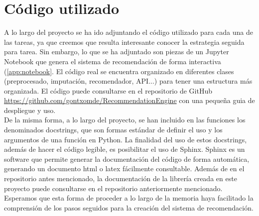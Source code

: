 \section{Código utilizado}

A lo largo del proyecto se ha ido adjuntando el código utilizado para cada una de las tareas, ya que creemos que resulta interesante conocer la estrategia seguida para tarea. Sin embargo, lo que se ha adjuntado son piezas de un Jupyter Notebook que genera el sistema de recomendación de forma interactiva (\autoref{app:notebook}. El código real se encuentra organizado en diferentes clases (preprocesado, imputación, recomendador, API...) para tener una estructura más organizada. El código puede consultarse en el repositorio de GitHub \url{https://github.com/gontxomde/RecommendationEngine} con una pequeña guia de despliegue y uso.\\

De la misma forma, a lo largo del proyecto, se han incluido en las funciones los denominados docstrings, que son formas estándar de definir el uso y los argumentos de una función en Python. La finalidad del uso de estos docstrings, además de hacer el código legible, es posibilitar el uso de Sphinx. Sphinx es un software que permite generar la documentación del código de forma automática, generando un documento html o latex fácilmente consultable. Además de en el repositorio antes mencionado, la documentación de la librería creada en este proyecto puede consultarse en el repositorio anteriormente mencionado.\\

Esperamos que esta forma de proceder a lo largo de la memoria haya facilitado la comprensión de los pasos seguidos para la creación del sistema de recomendación.


